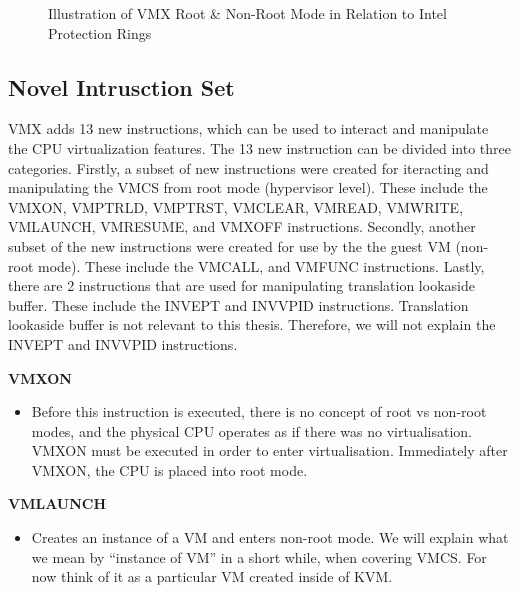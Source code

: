\documentclass{report}
\begin{document}
\begin{spacing}{1.5}
\begin{figure}[ht]
    \centering
    \caption{Illustration of VMX Root \& Non-Root Mode in Relation to Intel Protection Rings}
\end{figure}


\subsection{Novel Intrusction Set}

{\large
VMX adds 13 new instructions, which can be used to interact and manipulate the CPU virtualization features. The 13 new instruction can be divided into three categories. Firstly, a subset of new instructions were created for iteracting and manipulating the VMCS from root mode (hypervisor level). These include the VMXON, VMPTRLD, VMPTRST, VMCLEAR, VMREAD, VMWRITE, VMLAUNCH, VMRESUME, and VMXOFF instructions. Secondly, another subset of the new instructions were created for use by the the guest VM (non-root mode). These include the VMCALL, and VMFUNC instructions. Lastly, there are 2 instructions that are used for manipulating translation lookaside buffer. These include the INVEPT and INVVPID instructions. Translation lookaside buffer is not relevant to this thesis. Therefore, we will not explain the INVEPT and INVVPID instructions.
\newline
}

{\large

\textbf{VMXON}
\begin{itemize}
\item[] Before this instruction is executed, there is no concept of root vs non-root modes, and the physical CPU operates as if there was no virtualisation. VMXON must be executed in order to enter virtualisation. Immediately after VMXON, the CPU is placed into root mode.
\end{itemize}

\textbf{VMLAUNCH}
\begin{itemize}
\item[] Creates an instance of a VM and enters non-root mode. We will explain what we mean by “instance of VM” in a short while, when covering VMCS. For now think of it as a particular VM created inside of KVM.
\end{itemize}

}
\end{spacing}
\end{document}
